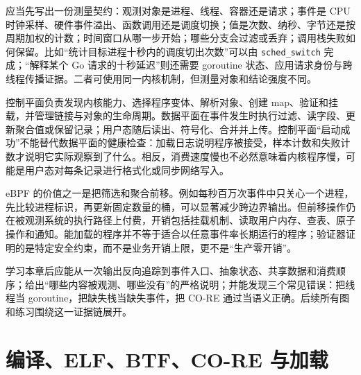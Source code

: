 \documentclass[UTF8,fontset=fandol,openany,11pt]{ctexbook}
\begin{document}
应当先写出一份测量契约：观测对象是进程、线程、容器还是请求；事件是 CPU 时钟采样、硬件事件溢出、函数调用还是调度切换；值是次数、纳秒、字节还是按周期加权的计数；时间窗口从哪一步开始；哪些分支会过滤或丢弃；调用栈失败如何保留。比如“统计目标进程十秒内的调度切出次数”可以由 \texttt{sched\_\allowbreak{}switch} 完成；“解释某个 Go 请求的十秒延迟”则还需要 goroutine 状态、应用请求身份与跨线程传播证据。二者可使用同一内核机制，但测量对象和结论强度不同。\cite{eb-sched-trace}\cite{eb-sched-core}\cite{eb-go-runtime}


控制平面负责发现内核能力、选择程序变体、解析对象、创建 map、验证和挂载，并管理链接与对象的生命周期。数据平面在事件发生时执行过滤、读字段、更新聚合值或保留记录；用户态随后读出、符号化、合并并上传。控制平面“启动成功”不能替代数据平面的健康检查：加载日志说明程序被接受，样本计数和失败计数才说明它实际观察到了什么。相反，消费速度慢也不必然意味着内核程序慢，可能是用户态对每条记录进行格式化或同步网络写入。\cite{eb-libbpf-overview}\cite{eb-ring-consume}


eBPF 的价值之一是把筛选和聚合前移。例如每秒百万次事件中只关心一个进程，先比较进程标识，再更新固定数量的桶，可以显著减少跨边界输出。但前移操作仍在被观测系统的执行路径上付费，开销包括挂载机制、读取用户内存、查表、原子操作和通知。能加载的程序并不等于适合以任意事件率长期运行的程序；验证器证明的是特定安全约束，而不是业务开销上限，更不是“生产零开销”。\cite{eb-verifier-doc}\cite{eb-map-array-code}\cite{eb-ring-code}


学习本章后应能从一次输出反向追踪到事件入口、抽象状态、共享数据和消费顺序；给出“哪些内容被观测、哪些没有”的严格说明；并能发现三个常见错误：把线程当 goroutine，把缺失栈当缺失事件，把 CO-RE 通过当语义正确。后续所有图和练习围绕这一证据链展开。\cite{eb-go-runtime}\cite{eb-stack-helper}\cite{eb-core-relo}


\section{编译、ELF、BTF、CO-RE 与加载}
\end{document}

